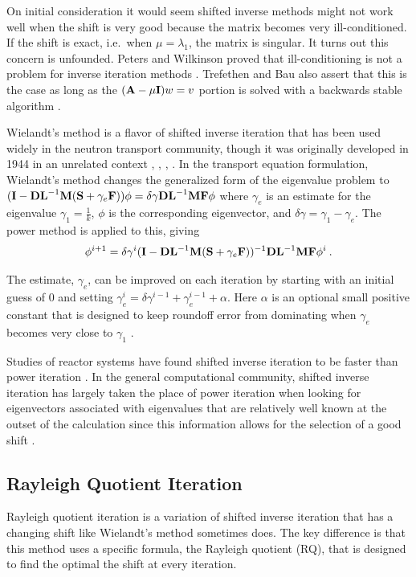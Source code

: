 On initial consideration it would seem shifted inverse methods might not work well when the shift is very good because the matrix becomes very ill-conditioned. If the shift is exact, i.e.\ when $\mu = \lambda_{1}$, the matrix is singular. It turns out this concern is unfounded. Peters and Wilkinson proved that ill-conditioning is not a problem for inverse iteration methods \cite{Peters1979}. Trefethen and Bau also assert that this is the case as long as the $(\mathbf{A}-\mu \mathbf{I})w = v$ portion is solved with a backwards stable algorithm \cite{Trefethen1997}.

Wielandt's method is a flavor of shifted inverse iteration that has been used widely in the neutron transport community, though it was originally developed in 1944 in an unrelated context \cite{Zinzani2008}, \cite{Itagaki1996}, \cite{Itagaki2002}, \cite{Ipsen}. In the transport equation formulation, Wielandt's method changes the generalized form of the eigenvalue problem to $(\mathbf{I} - \mathbf{DL}^{-1}\mathbf{M}(\mathbf{S} +\gamma_e \mathbf{F}))\phi = \delta \gamma \mathbf{DL}^{-1}\mathbf{MF} \phi$ where $\gamma_e$ is an estimate for the eigenvalue $\gamma_1 = \frac{1}{k}$, $\phi$ is the corresponding eigenvector, and $\delta \gamma = \gamma_1 - \gamma_e$. The power method is applied to this, giving \cite{Nakamura1977}
%
\begin{equation}
\phi^{i+1} = \delta \gamma^{i}(\mathbf{I} - \mathbf{DL}^{-1}\mathbf{M}(\mathbf{S} + \gamma_e \mathbf{F}))^{-1}\mathbf{DL}^{-1}\mathbf{MF}\phi^{i} \:. \label{eq:Wielandt}
\end{equation}

The estimate, $\gamma_e$, can be improved on each iteration by starting with an initial guess of $0$ and setting $\gamma_e^i = \delta \gamma^{i-1} + \gamma_e^{i-1} + \alpha$. Here $\alpha$ is an optional small positive constant that is designed to keep roundoff error from dominating when $\gamma_e$ becomes very close to $\gamma_1$ \cite{Nakamura1977}. 

Studies of reactor systems have found shifted inverse iteration to be faster than power iteration \cite{Allen2002}. In the general computational community, shifted inverse iteration has largely taken the place of power iteration when looking for eigenvectors associated with eigenvalues that are relatively well known at the outset of the calculation since this information allows for the selection of a good shift \cite{Ipsen}.  

\subsection{Rayleigh Quotient Iteration}
Rayleigh quotient iteration is a variation of shifted inverse iteration that has a changing shift like Wielandt's method sometimes does. The key difference is that this method uses a specific formula, the Rayleigh quotient (RQ), that is designed to find the optimal the shift at every iteration. 

